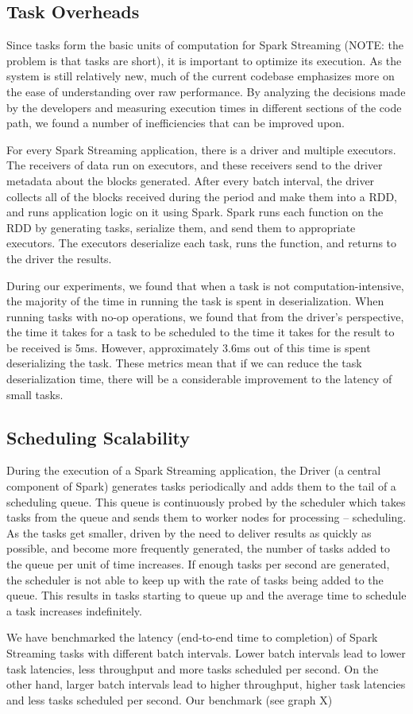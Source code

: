 \subsection{Task Overheads}
Since tasks form the basic units of computation for Spark Streaming (NOTE: the problem is that tasks are short), it is important to optimize its execution. 
As the system is still relatively new, much of the current codebase emphasizes more on the ease of understanding over raw performance. By analyzing the decisions made by the developers and measuring execution times in different sections of the code path, we found a number of inefficiencies that can be improved upon.

For every Spark Streaming application, there is a driver and multiple executors. The receivers of data run on executors, and these receivers send to the driver metadata about the blocks generated. After every batch interval, the driver collects all of the blocks received during the period and make them into a RDD, and runs application logic on it using Spark. Spark runs each function on the RDD by generating tasks, serialize them, and send them to appropriate executors. The executors deserialize each task, runs the function, and returns to the driver the results.

During our experiments, we found that when a task is not computation-intensive, the majority of the time in running the task is spent in deserialization. When running tasks with no-op operations, we found that from the driver's perspective, the time it takes for a task to be scheduled to the time it takes for the result to be received is 5ms. However, approximately 3.6ms out of this time is spent deserializing the task. These metrics mean that if we can reduce the task deserialization time, there will be a considerable improvement to the latency of small tasks.


\subsection{Scheduling Scalability}

During the execution of a Spark Streaming application, the Driver (a central component of Spark) generates tasks periodically and adds them to the tail of a scheduling queue. This queue is continuously probed by the scheduler which takes tasks from the queue and sends them to worker nodes for processing -- scheduling.
As the tasks get smaller, driven by the need to deliver results as quickly as possible, and become more frequently generated, the number of tasks added to the queue per unit of time increases. If enough tasks per second are generated, the scheduler is not able to keep up with the rate of tasks being added to the queue. This results in tasks starting to queue up and the average time to schedule a task increases indefinitely.

We have benchmarked the latency (end-to-end time to completion) of Spark Streaming tasks with different batch intervals. Lower batch intervals lead to lower task latencies, less throughput and more tasks scheduled per second. On the other hand, larger batch intervals lead to higher throughput, higher task latencies and less tasks scheduled per second. Our benchmark (see graph X)  

